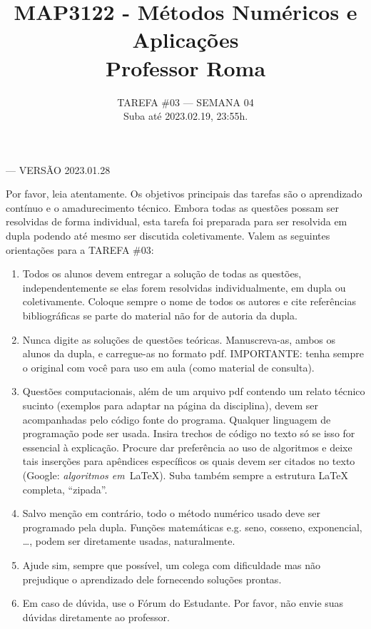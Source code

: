 \documentclass{article}
\title{MAP3122 - Métodos Numéricos e Aplicações\\ Professor Roma\\ }
\author{TAREFA \#03 --- SEMANA 04\\ Suba até 2023.02.19, 23:55h.}
\date{}
\begin{document}
\maketitle


    \vspace{-3mm}
    
    \mbox{}\hfill  --- VERSÃO 2023.01.28

\vspace{3mm}

Por favor, leia atentamente. Os objetivos principais das tarefas são o aprendizado contínuo e o amadurecimento técnico.
Embora todas as questões  possam ser resolvidas de forma individual, esta tarefa foi preparada para ser resolvida em dupla podendo até mesmo ser discutida coletivamente. Valem as seguintes orientações para a TAREFA \#03:

\begin{enumerate}
 
 \item Todos os alunos devem entregar a solução de todas as questões, independentemente se elas forem resolvidas individualmente, em dupla ou coletivamente. Coloque sempre o nome de todos os autores e cite referências bibliográficas se parte do material não for de autoria da dupla. 
 \item Nunca digite as soluções de questões teóricas. Manuscreva-as, ambos os alunos da dupla, e carregue-as no  formato pdf. IMPORTANTE: tenha sempre o original com você para uso em aula (como material de consulta).
 \item Questões computacionais, além de um arquivo pdf contendo um relato técnico sucinto (exemplos para adaptar na página da disciplina), devem ser acom\-panha\-das pelo código fonte do programa. Qualquer linguagem de programação pode ser usada. Insira trechos de código no texto só se isso for essencial à explicação. Procure dar preferência ao uso de algoritmos e deixe tais inserções para apêndices específicos os quais devem ser citados no texto (Google: {\it algoritmos em}\, \LaTeX). Suba também sempre a estrutura \LaTeX\, completa, ``zipada''.
 \item Salvo menção em contrário, todo o método numérico usado deve ser programado pela dupla. Funções matemáticas e.g. seno, cosseno, exponencial, \dots, podem ser diretamente usadas, naturalmente.
 \item Ajude sim, sempre que possível, um colega com dificuldade mas  não preju\-dique o aprendizado dele fornecendo soluções prontas.
 \item Em caso de dúvida, use o Fórum do Estudante. Por favor, não envie suas dúvidas diretamente ao professor.
\end{enumerate}
\end{document}
